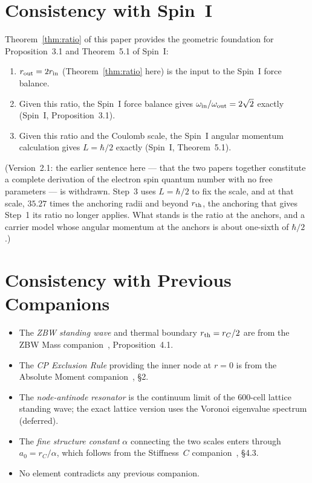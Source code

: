 \documentclass[12pt]{article}
\newcommand{\rC}{r_C}
\newcommand{\rth}{r_{\rm th}}
\newcommand{\rin}{r_{\rm in}}
\newcommand{\rout}{r_{\rm out}}
\newcommand{\oin}{\omega_{\rm in}}
\newcommand{\oout}{\omega_{\rm out}}
\newcommand{\aBohr}{a_0}
\begin{document}
\section{Consistency with Spin~I}
\label{sec:consistency_spinI}

Theorem~\ref{thm:ratio} of this paper provides the geometric
foundation for Proposition~3.1 and Theorem~5.1 of Spin~I:

\begin{enumerate}[noitemsep]
  \item $\rout = 2\rin$ (Theorem~\ref{thm:ratio} here) is the input
    to the Spin~I force balance.
  \item Given this ratio, the Spin~I force balance gives
    $\oin/\oout = 2\sqrt{2}$ exactly (Spin~I, Proposition~3.1).
  \item Given this ratio and the Coulomb scale, the Spin~I angular
    momentum calculation gives $L = \hbar/2$ exactly (Spin~I,
    Theorem~5.1).
\end{enumerate}

(Version~2.1: the earlier sentence here --- that the two papers together
constitute a complete derivation of the electron spin quantum number with no
free parameters --- is withdrawn. Step~3 uses $L = \hbar/2$ to fix the scale, and
at that scale, $35.27$ times the anchoring radii and beyond $\rth$, the anchoring
that gives Step~1 its ratio no longer applies. What stands is the ratio at the
anchors, and a carrier model whose angular momentum at the anchors is about
one-sixth of $\hbar/2$.)

\section{Consistency with Previous Companions}
\label{sec:consistency}

\begin{itemize}[noitemsep]
  \item The \emph{ZBW standing wave} and thermal boundary
    $\rth = \rC/2$ are from the ZBW Mass companion~\cite{c4},
    Proposition~4.1.
  \item The \emph{CP Exclusion Rule} providing the inner node at
    $r = 0$ is from the Absolute Moment companion~\cite{c1}, \S2.
  \item The \emph{node-antinode resonator} is the continuum limit
    of the 600-cell lattice standing wave; the exact lattice
    version uses the Voronoi eigenvalue spectrum (deferred).
  \item The \emph{fine structure constant} $\alpha$ connecting
    the two scales enters through $\aBohr = \rC/\alpha$, which
    follows from the Stiffness~$C$ companion~\cite{c2}, \S4.3.
  \item No element contradicts any previous companion.
\end{itemize}
\end{document}
